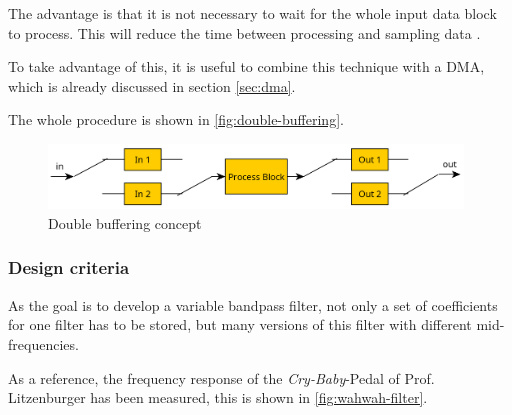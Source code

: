 The advantage is that it is not necessary to wait for the whole input data block to process.
This will reduce the time between processing and sampling data \cite{eetimes_fund_dsp}.

To take advantage of this, it is useful to combine this technique with a \ac{DMA},
which is already discussed in section \ref{sec:dma}.

The whole procedure is shown in \autoref{fig:double-buffering}.

\begin{figure}[!h]
    \centering
    \includegraphics[width=11cm]{img/double_buffering.PNG}
    \caption{Double buffering concept \cite{eetimes_fund_dsp}}
    \label{fig:double-buffering}
\end{figure}

\subsubsection{Design criteria}

As the goal is to develop a variable bandpass filter, not only a set of coefficients for one filter has to be stored,
but many versions of this filter with different mid-frequencies.

As a reference, the frequency response of the \textit{Cry-Baby}-Pedal of Prof. Litzenburger has been measured, this is
shown in \autoref{fig:wahwah-filter}.

